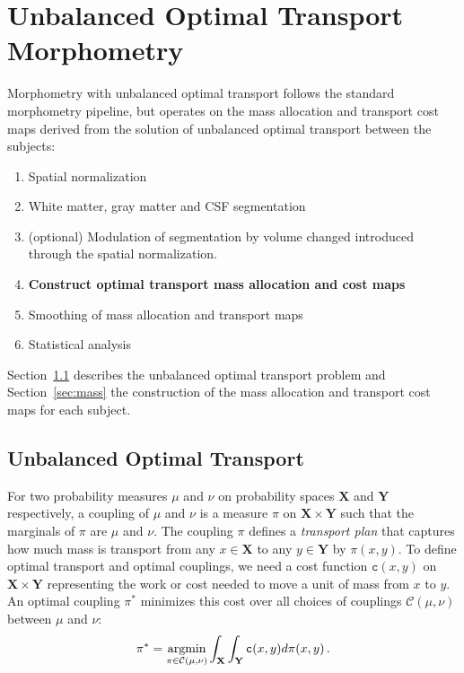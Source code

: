 \documentclass{llncs}
\newcommand{\cost}[0]{\mathtt{c}}
\newcommand{\coupling}[0]{\pi}
\def\argmin{\mathop{\rm argmin}}
\newcommand{\Xsp}{{\mathbf{X}}}
\newcommand{\Ysp}{{\mathbf{Y}}}
\begin{document}
\section{Unbalanced Optimal Transport Morphometry}
Morphometry with unbalanced optimal transport follows the standard morphometry
pipeline, but operates on the mass allocation and transport cost maps derived
from the solution of unbalanced optimal transport between the subjects:
\begin{enumerate}
\item Spatial normalization
\item White matter, gray matter and CSF segmentation
\item (optional) Modulation of segmentation by volume changed introduced
through the spatial normalization.
\item {\bf Construct optimal transport mass allocation and cost maps}
\item Smoothing of mass allocation and transport maps
\item Statistical analysis
\end{enumerate}

Section~\ref{sec:unbalanced} describes the unbalanced optimal transport problem
and Section~\ref{sec:mass} the construction of the mass allocation and
transport cost maps for each subject.



\subsection{Unbalanced Optimal Transport}
\label{sec:unbalanced}
For two probability measures $\mu$ and $\nu$ on probability spaces ${\Xsp}$
and ${\Ysp}$ respectively, a coupling of $\mu$ and $\nu$ is a measure
$\coupling$ on ${\Xsp}\times{\Ysp}$ such that the marginals of $\coupling$ are
$\mu$ and $\nu$. The coupling $\coupling$ defines a {\em transport plan} that
captures how much mass is transport from any $x \in \Xsp$ to  any $y \in \Ysp$
by $\coupling(x, y)$. To define optimal transport and optimal couplings, we
need a cost function $\cost(x,y)$ on ${\Xsp}\times{\Ysp}$ representing the work
or cost needed to move a unit of mass from $x$ to $y$. An optimal coupling
$\coupling^*$ minimizes this cost over all choices of couplings
$\mathcal{C}(\mu,\nu)$ between
$\mu$ and $\nu$: 
\begin{equation}
  \coupling^*= \argmin_{\coupling\in\mathcal{C}(\mu,\nu)} \int_{{\Xsp}}\int_{{\Ysp}}
\cost(x,y)  d\coupling(x,y) \,.  
\end{equation}
\end{document}
